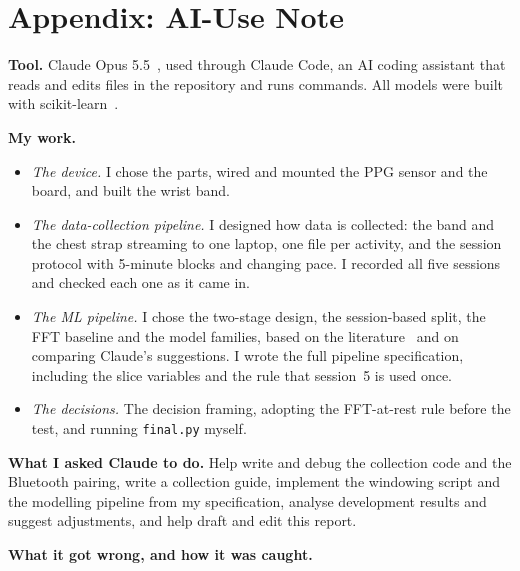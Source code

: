 \documentclass[conference]{IEEEtran}
\begin{document}
\clearpage
\appendix
\section*{Appendix: AI-Use Note}

\textbf{Tool.} Claude Opus 5.5~\cite{claude2026}, used through Claude Code, an AI coding assistant that reads and edits files in the repository and runs commands. All models were built with scikit-learn~\cite{sklearn}.

\textbf{My work.}
\begin{itemize}
\item \emph{The device.} I chose the parts, wired and mounted the PPG sensor and the board, and built the wrist band.
\item \emph{The data-collection pipeline.} I designed how data is collected: the band and the chest strap streaming to one laptop, one file per activity, and the session protocol with 5-minute blocks and changing pace. I recorded all five sessions and checked each one as it came in.
\item \emph{The ML pipeline.} I chose the two-stage design, the session-based split, the FFT baseline and the model families, based on the literature~\cite{vicente2023} and on comparing Claude's suggestions. I wrote the full pipeline specification, including the slice variables and the rule that session~5 is used once.
\item \emph{The decisions.} The decision framing, adopting the FFT-at-rest rule before the test, and running \texttt{final.py} myself.
\end{itemize}

\textbf{What I asked Claude to do.} Help write and debug the collection code and the Bluetooth pairing, write a collection guide, implement the windowing script and the modelling pipeline from my specification, analyse development results and suggest adjustments, and help draft and edit this report.

\textbf{What it got wrong, and how it was caught.}
\end{document}
